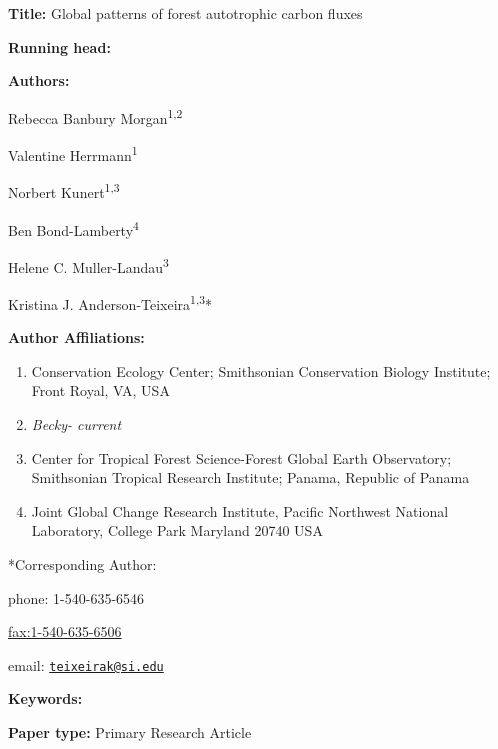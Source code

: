 \documentclass[
]{article}
\author{}
\date{\vspace{-2.5em}}
\begin{document}
\textbf{Title:} Global patterns of forest autotrophic carbon fluxes

\textbf{Running head:}

\textbf{Authors:}

Rebecca Banbury Morgan\textsuperscript{1,2}

Valentine Herrmann\textsuperscript{1}

Norbert Kunert\textsuperscript{1,3}

Ben Bond-Lamberty\textsuperscript{4}

Helene C. Muller-Landau\textsuperscript{3}

Kristina J. Anderson-Teixeira\textsuperscript{1,3}*

\textbf{Author Affiliations:}

\begin{enumerate}
\def\labelenumi{\arabic{enumi}.}
\item
  Conservation Ecology Center; Smithsonian Conservation Biology
  Institute; Front Royal, VA, USA
\item
  \emph{Becky- current}
\item
  Center for Tropical Forest Science-Forest Global Earth Observatory;
  Smithsonian Tropical Research Institute; Panama, Republic of Panama
\item
  Joint Global Change Research Institute, Pacific Northwest National
  Laboratory, College Park Maryland 20740 USA
\end{enumerate}

*Corresponding Author:

phone: 1-540-635-6546

\url{fax:1-540-635-6506}

email: \href{mailto:teixeirak@si.edu}{\nolinkurl{teixeirak@si.edu}}

\textbf{Keywords:}

\textbf{Paper type:} Primary Research Article

\newpage
\end{document}

